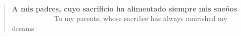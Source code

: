 \documentclass[12pt,hidelinks,openright,a4paper,english]{book}
\makeatletter
\newenvironment{dedication}
    {\vspace{6ex}\begin{quotation}\begin{center}\begin{em}}
    {\par\end{em}\end{center}\end{quotation}}
\renewcommand{\cleardoublepage}{
\clearpage\ifodd\c@page\else
\hbox{}
\vspace*{\fill}
\thispagestyle{empty}
\newpage
\fi}
\makeatother
\begin{document}
\pagestyle{empty}

\thispagestyle{empty}




~\\
\newpage
\vspace*{3cm}
\pagestyle{empty}
\begin{dedication}
\scriptsize
\begin{changemargin}{5cm}{-8cm} 
\hspace{0cm} \textbf{A mis padres, cuyo sacrificio ha alimentado siempre mis sueños}\\
\hspace{0cm} ~~~~~~~~~~~~To my parents, whose sacrifice has always nourished my dreams\\
\end{changemargin}
\textsc{}
\end{dedication}
\textsc{}
\cleardoublepage
%


\frontmatter
\pagestyle{fancy}
\setlength{\parskip}{1ex}






\listoffigures



\tableofcontents







\mainmatter
\end{document}
